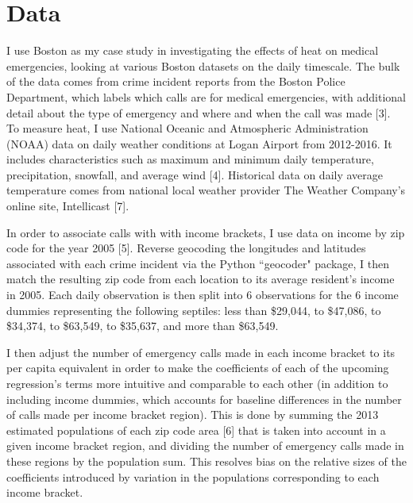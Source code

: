 \documentclass[11pt, oneside]{article}      %
\begin{document}
\section{Data}
I use Boston as my case study in investigating the effects of heat on medical emergencies, looking at various Boston datasets on the daily timescale. The bulk of the data comes from crime incident reports from the Boston Police Department, which labels which calls are for medical emergencies, with additional detail about the type of emergency and where and when the call was made [3]. To measure heat, I use National Oceanic and Atmospheric Administration (NOAA) data on daily weather conditions at Logan Airport from 2012-2016. It includes characteristics such as maximum and minimum daily temperature, precipitation, snowfall, and average wind [4]. Historical data on daily average temperature comes from national local weather provider The Weather Company's online site, Intellicast [7].

In order to associate calls with with income brackets, I use data on income by zip code for the year 2005 [5]. Reverse geocoding the longitudes and latitudes associated with each crime incident via the Python ``geocoder" package, I then match the resulting zip code from each location to its average resident's income in 2005. Each daily observation is then split into 6 observations for the 6 income dummies representing the following septiles: less than \$29,044, to \$47,086, to \$34,374, to \$63,549, to \$35,637, and more than \$63,549.

I then adjust the number of emergency calls made in each income bracket to its per capita equivalent in order to make the coefficients of each of the upcoming regression's terms more intuitive and comparable to each other (in addition to including income dummies, which accounts for baseline differences in the number of calls made per income bracket region). This is done by summing the 2013 estimated populations of each zip code area [6] that is taken into account in a given income bracket region, and dividing the number of emergency calls made in these regions by the population sum. This resolves bias on the relative sizes of the coefficients introduced by variation in the populations corresponding to each income bracket.
\end{document}

